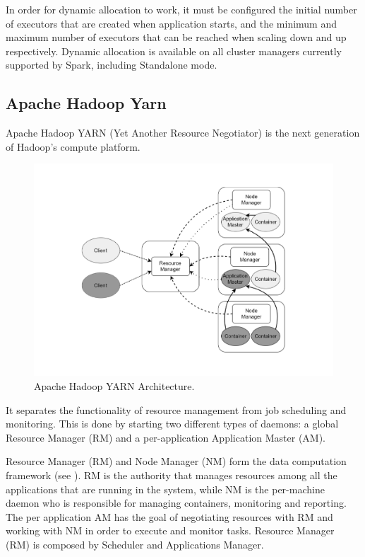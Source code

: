 In order for dynamic allocation to work, it must be configured the initial number of executors that are created when application starts, and the minimum and maximum number of executors that can be reached when scaling down and up respectively. Dynamic allocation is available on all cluster managers currently supported by Spark, including Standalone mode.

\subsection{Apache Hadoop Yarn}\label{sec:hadoop_yarn}
Apache Hadoop YARN (Yet Another Resource Negotiator) is the next  
generation of Hadoop’s compute platform\cite{Vavilapalli:2013:AHY:2523616.2523633}. 
\begin{figure}
	\centering
	\includegraphics[width=\columnwidth]{Images/apache_hadoop_yarn_architecture.pdf}  
	\caption[Apache Hadoop YARN Architecture]{Apache Hadoop YARN Architecture.}
	\label{fig:apacheHadoopYarnArchitecture}
\end{figure}
It separates the functionality of resource management from job scheduling and monitoring. This is done by starting two different types of daemons: a global Resource Manager (RM) and a per-application Application Master (AM). 

Resource Manager (RM) and Node Manager (NM) form the data computation framework (see ). RM is the authority that manages resources among all the applications that are running in the system, while NM is the per-machine daemon who is responsible for managing containers, monitoring and reporting. The per application AM has the goal of negotiating resources with RM and working with NM in order to execute and monitor tasks. Resource Manager (RM) is composed by Scheduler and Applications Manager. 

